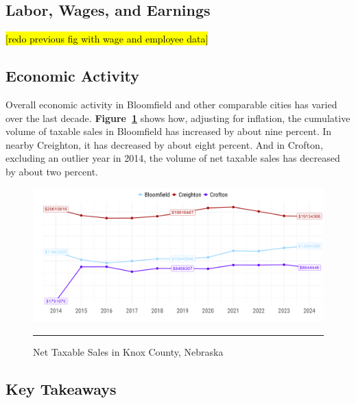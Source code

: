\subsection{Labor, Wages, and Earnings}

\noindent \hl{[redo previous fig with wage and employee data]}

\subsection{Economic Activity}

\noindent Overall economic activity in Bloomfield and other comparable cities has varied over the last decade. \textbf{Figure~\ref{fig:netTaxableSales}} shows how, adjusting for inflation, the cumulative volume of taxable sales in Bloomfield has increased by about nine percent. In nearby Creighton, it has decreased by about eight percent. And in Crofton, excluding an outlier year in 2014, the volume of net taxable sales has decreased by about two percent.

\begin{figure}[H]
\centering
\begin{framed}
    \caption{Net Taxable Sales in Knox County, Nebraska}
    \label{fig:netTaxableSales}
    \includegraphics[width=\linewidth]{figures/net_taxable_sales.png}
    \rule[-5pt]{\linewidth}{0.4pt}
\end{framed}
\end{figure}

\pagebreak
\subsection*{Key Takeaways}
